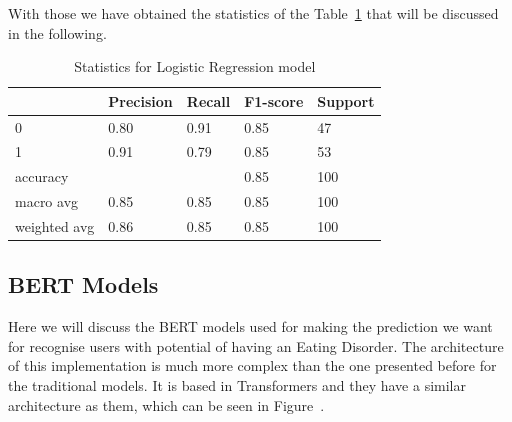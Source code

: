 With those we have obtained the statistics of the Table~\ref{tab:LogisticRegressionStatistics} that will be discussed in the following.
\begin{table}[!htp]
\centering
\begin{tabular}{|l|l|l|l|l|}
\hline
\textbf{}    & \textbf{Precision} & \textbf{Recall} & \textbf{F1-score} & \textbf{Support} \\ \hline
0            & 0.80               & 0.91            & 0.85     & 47      \\ \hline
1            & 0.91               & 0.79            & 0.85     & 53      \\ \hline
accuracy     &                    &                 & 0.85     & 100     \\ \hline
macro avg    & 0.85               & 0.85            & 0.85     & 100     \\ \hline
weighted avg & 0.86               & 0.85            & 0.85     & 100     \\ \hline
\end{tabular}
\caption{Statistics for Logistic Regression model}
\label{tab:LogisticRegressionStatistics}
\end{table}


\subsection{BERT Models}
Here we will discuss the BERT models used for making the prediction we want for recognise users with potential of having an Eating Disorder. The architecture of this implementation is much more complex than the one presented before for the traditional models. It is based in Transformers and they have a similar architecture as them, which can be seen in Figure~\cite{fig:BERTarchitecture}.

